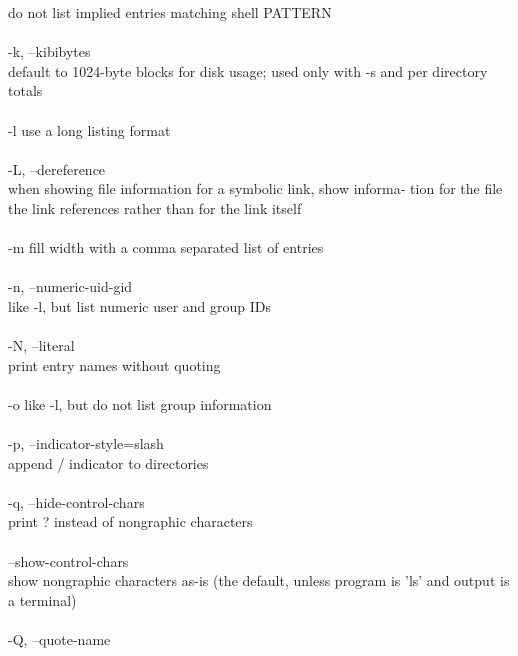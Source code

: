 \documentclass{article}
\begin{document}
\tabto{2cm}              do not list implied entries matching shell PATTERN \\
\\
\tabto{1cm}       -k, --kibibytes \\
\tabto{2cm}              default  to  1024-byte  blocks for disk usage; used only with -s
\tabto{2cm}              and per directory totals \\
\\
\tabto{1cm}       -l     use a long listing format \\
\\
\tabto{1cm}       -L, --dereference \\
\tabto{2cm}              when showing file information for a symbolic link, show informa‐
\tabto{2cm}              tion  for  the file the link references rather than for the link
\tabto{1cm}              itself \\
\\
\tabto{1cm}       -m     fill width with a comma separated list of entries \\
\\
\tabto{1cm}       -n, --numeric-uid-gid \\
\tabto{2cm}              like -l, but list numeric user and group IDs \\
\\
\tabto{1cm}       -N, --literal \\
\tabto{2cm}              print entry names without quoting \\
\\
\tabto{1cm}       -o     like -l, but do not list group information \\
\\
\tabto{1cm}       -p, --indicator-style=slash \\
\tabto{2cm}              append / indicator to directories \\
\\
\tabto{1cm}       -q, --hide-control-chars \\
\tabto{2cm}             print ? instead of nongraphic characters \\
\\
\tabto{1cm}       --show-control-chars \\
\tabto{2cm}              show nongraphic characters as-is (the default, unless program is
\tabto{2cm}              'ls' and output is a terminal) \\
\\
\tabto{1cm}       -Q, --quote-name \\
\end{document}
